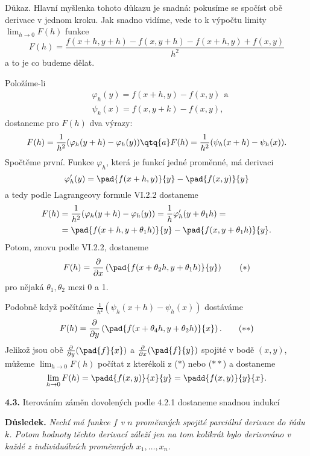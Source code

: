 \documentclass[12pt]{article}
\begin{document}
{{Důkaz.} Hlavní myšlenka tohoto důkazu je snadná: pokusíme se spočíst obě derivace v jednom kroku. Jak snadno vidíme, vede to k výpočtu limity $\lim_{h\to 0}F(h)$ funkce 
$$
F(h)=\frac{f(x+h,y+h)-f(x,y+h)-f(x+h,y)+f(x,y)}{h^2}
$$
a to je co budeme dělat.

Položíme-li
$$
\begin{aligned}
&\varphi_h(y)=f(x+h,y)-f(x,y) \ \ \text{a}\\
&\psi_k(x)=f(x,y+k)-f(x,y),
\end{aligned}
$$
dostaneme pro $F(h)$  dva výrazy:
$$
F(h)=\frac{1}{h^2}(\varphi_h(y+h)-\varphi_h(y))\qtq{a} F(h)=\frac{1}{h^2}(\psi_h(x+h)-\psi_h(x)).
$$
Spočtěme první. Funkce $\varphi_h$, která je funkcí jedné proměnné,
 má derivaci
$$
\varphi_h'(y)=\pad{f(x+h,y)}{y}-\pad{f(x,y)}{y}
$$
a tedy podle Lagrangeovy formule VI.2.2 dostaneme
$$
\begin{aligned}
F(h)&=\frac{1}{h^2}(\varphi_h(y+h)-\varphi_h(y))=\frac1h\varphi_h'(y+\theta_1h)=\\
&=\pad{f(x+h,y+\theta_1h)}{y}-\pad{f(x,y+\theta_1h)}{y}.
\end{aligned}
$$
Potom, znovu podle  VI.2.2, dostaneme
\begin{equation}
F(h)=\frac{\partial}{\partial x}\left(\pad{f(x+\theta_2h,y+\theta_1h)}{y}\right) \tag{$*$}
\end{equation}
pro nějaká $\theta_1,\theta_2$ mezi 0 a 1.

Podobně když počítáme $\frac{1}{h^2}(\psi_h(x+h)-\psi_h(x))$ dostáváme
\begin{equation}
F(h)=\frac{\partial}{\partial y}\left(\pad{f(x+\theta_4h,y+\theta_2h)}{x}\right). \tag{$**$}
\end{equation}
Jelikož jsou obě $\frac{\partial}{\partial y}(\pad{f}{x})$ a
$\frac{\partial}{\partial x}(\pad{f}{y})$ spojité v bodě $(x,y)$, můžeme
$\lim_{h\to 0}F(h)$ počítat z kterékoli z  ($*$)   nebo ($**$) a  dostaneme
$$
\lim_{h\to 0}F(h)=\padd{f(x,y)}{x}{y}=\padd{f(x,y)}{y}{x}.
$$ \sq


\bigskip

{\bf 4.3.} Iterováním záměn dovolených podle 4.2.1 dostaneme snadnou indukcí

\medskip

{\bf Důsledek.} {\em Nechť má funkce $f$ v $n$ proměnných
spojité parciální derivace do řádu $k$. Potom hodnoty
těchto derivací záleží jen na tom kolikrát bylo derivováno v každé
z individuálních proměnných
 $x_1,\dots,x_n$.}


\medskip

}
\end{document}
